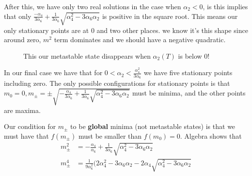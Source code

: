 \documentclass[11pt, oneside]{article}   	%
\begin{document}
After this, we have only two real solutions 
in the case when  $ \alpha_2 < 0 $, is this implies that only 
$ \frac{ - \alpha_4 }{3 \alpha_6 } + \frac{1 }{ 3 \alpha_6 }\sqrt{ \alpha_4^2  - 3 \alpha_6 \alpha_2 } $ 
is positive in the square root. 
This means our only stationary points are at 0 and two other places. 
we know it's this shape since around zero, $m^2 $ term dominates and we should have a negative 
quadratic. 

\begin{figure}[h]
\centering
{} 
\caption{This our metastable state disappears when $\alpha_2 ( T ) $ is below 0!}
\end{figure}

In our final case we have that for $ 0 < \alpha_2 < \frac{\alpha_4^2 }{3 \alpha_6 }$ 
we have five stationary points including zero. 
The only possible configurations for stationary points is that 
$ m_0  = 0, m_\pm  = \pm \sqrt{  - \frac{\alpha_4}{3\alpha_6 } + \frac{1}{3 \alpha_6 } \sqrt{ \alpha_4^2 - 3 \alpha_6 \alpha_2 } } $ 
must be minima, and the other points are maxima. 

Our condition for $ m_\pm$ to be \textbf{global} minima (not metastable states) 
is that we must have that $ f ( m_\pm) $ must be smaller than $ f (m_0 ) = 0 $. 
Algebra shows that 
\begin{align*}
m_\pm^2 & =  - \frac{\alpha_4}{\alpha_6 } + \frac{1}{ 3 \alpha_6 } \sqrt{ \alpha_4 ^ 2 - 3 \alpha_6 \alpha_2 } \\
m_\pm^ 4 & = \frac{1}{ 9 \alpha_6 ^ 2 } ( 2 \alpha_4 ^ 2 - 3 \alpha_6 \alpha_2  - 2 \alpha_4 \sqrt{ \alpha_4^2 - 3 \alpha_6 \alpha_2 } 
\end{align*}
\end{document}
